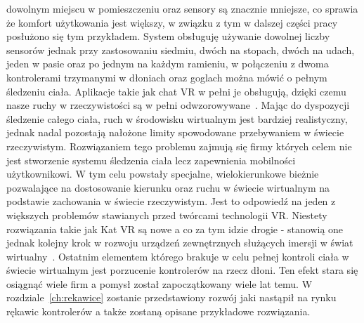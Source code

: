 dowolnym miejscu w pomieszczeniu oraz sensory są znacznie mniejsze, co sprawia że komfort użytkowania jest większy, w związku z tym w dalszej części pracy posłużono się tym przykładem. System obsługuję używanie dowolnej liczby sensorów jednak przy zastosowaniu siedmiu, dwóch na stopach, dwóch na udach, jeden w pasie oraz po jednym na każdym ramieniu, w połączeniu z dwoma kontrolerami trzymanymi w dłoniach oraz goglach można mówić o pełnym śledzeniu ciała. Aplikacje takie jak chat VR w pełni je obsługują, dzięki czemu nasze ruchy w rzeczywistości są w pełni odwzorowywane~\cite{body}. Mając do dyspozycji śledzenie całego ciała, ruch w środowisku wirtualnym jest bardziej realistyczny, jednak nadal pozostają nałożone limity spowodowane przebywaniem w świecie rzeczywistym. Rozwiązaniem tego problemu zajmują się firmy których celem nie jest stworzenie systemu śledzenia ciała lecz zapewnienia mobilności użytkownikowi. W tym celu powstały specjalne, wielokierunkowe bieżnie pozwalające na dostosowanie kierunku oraz ruchu w świecie wirtualnym na podstawie zachowania w świecie rzeczywistym. Jest to odpowiedź na jeden z większych problemów stawianych przed twórcami technologii VR. Niestety rozwiązania takie jak Kat VR są nowe a co za tym idzie drogie - stanowią one jednak kolejny krok w rozwoju urządzeń zewnętrznych służących imersji w świat wirtualny~\cite{cat}. Ostatnim elementem którego brakuje w celu pełnej kontroli ciała w świecie wirtualnym jest porzucenie kontrolerów na rzecz dłoni. Ten efekt stara się osiągnąć wiele firm a pomysł został zapoczątkowany wiele lat temu. W rozdziale~\ref{ch:rekawice} zostanie przedstawiony rozwój jaki nastąpił na rynku rękawic kontrolerów  a także zostaną opisane przykładowe rozwiązania.